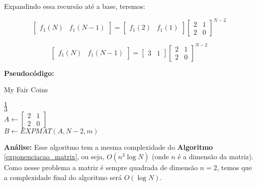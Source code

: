 Expandindo essa recursão até a base, teremos:

\[ 
\begin{bmatrix}
       f_1(N) & f_1(N-1)
\end{bmatrix}
=
\begin{bmatrix}
       f_1(2) & f_1(1)
\end{bmatrix}
\begin{bmatrix}
       2 & 1           \\[0.3em]
       2 & 0    
\end{bmatrix}^{N-2}
\]


\[ 
\begin{bmatrix}
       f_1(N) & f_1(N-1)
\end{bmatrix}
=
\begin{bmatrix}
       3 & 1
\end{bmatrix}
\begin{bmatrix}
       2 & 1           \\[0.3em]
       2 & 0    
\end{bmatrix}^{N-2}
\]
\clearpage

\textbf{Pseudocódigo:}
\begin{algorithm}
\caption{My Fair Coins}
\begin{algorithmic}[1]
\State \Return $1$
\EndIf
\\
\State \Return $3$
\EndIf
\\
\State $A \gets 
\begin{bmatrix}
2 & 1           \\[0.3em]
2 & 0
\end{bmatrix}
$
\\
\State $B \gets EXPMAT(A, N-2, m)$ 
\\
\State {}
\EndProcedure
\end{algorithmic}
\end{algorithm}

\textbf{Análise:}
Esse algoritmo tem a mesma complexidade do \textbf{Algoritmo} \autoref{exponenciacao_matrix}, ou seja, $O(n^3 \log N)$ (onde $n$ é a dimensão da matriz).
Como nesse problema a matriz é sempre quadrada de dimensão $n=2$, temos que a complexidade final do algoritmo será $O(\log N)$.

